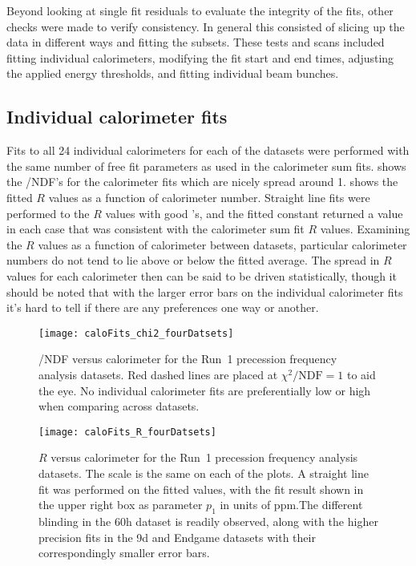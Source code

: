 Beyond looking at single fit residuals to evaluate the integrity of the fits, other checks were made to verify consistency. In general this consisted of slicing up the data in different ways and fitting the subsets. These tests and scans included fitting individual calorimeters, modifying the fit start and end times, adjusting the applied energy thresholds, and fitting individual beam bunches.





\clearpage

\subsection{Individual calorimeter fits}
\label{sub:per_calorimeter_fits}


Fits to all 24 individual calorimeters for each of the datasets were performed with the same number of free fit parameters as used in the calorimeter sum fits.  shows the \chisq/NDF's for the calorimeter fits which are nicely spread around 1.  shows the fitted $R$ values as a function of calorimeter number. Straight line fits were performed to the $R$ values with good \chisq's, and the fitted constant returned a value in each case that was consistent with the calorimeter sum fit $R$ values. Examining the $R$ values as a function of calorimeter between datasets, particular calorimeter numbers do not tend to lie above or below the fitted average. The spread in $R$ values for each calorimeter then can be said to be driven statistically, though it should be noted that with the larger error bars on the individual calorimeter fits it's hard to tell if there are any preferences one way or another.


\begin{figure}
\centering
\texttt{[image: caloFits\_chi2\_fourDatsets]}
    \caption[\chisq/NDF versus calorimeter number]{\chisq/NDF versus calorimeter for the Run~1 precession frequency analysis datasets. Red dashed lines are placed at $\chi^{2}/\text{NDF} = 1$ to aid the eye. No individual calorimeter fits are preferentially low or high when comparing across datasets.}
    \label{fig:caloFits_chi2}
\vspace{4mm}
\texttt{[image: caloFits\_R\_fourDatsets]}
    \caption[$R$ versus calorimeter number]{$R$ versus calorimeter for the Run~1 precession frequency analysis datasets. The scale is the same on each of the plots.  A straight line fit was performed on the fitted values, with the fit result shown in the upper right box as parameter $p_{1}$ in units of ppm.The different blinding in the 60h dataset is readily observed, along with the higher precision fits in the 9d and Endgame datasets with their correspondingly smaller error bars.}
    \label{fig:caloFits_R}
\end{figure}


